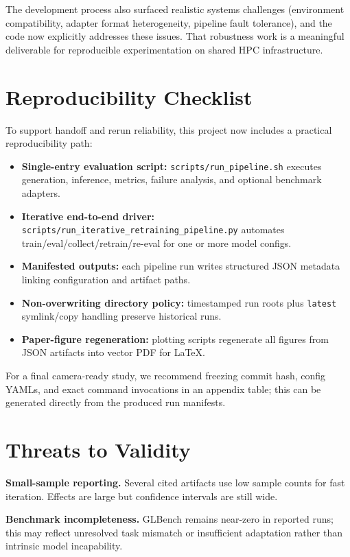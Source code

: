 \documentclass[sigplan,screen]{acmart}
\begin{document}
The development process also surfaced realistic systems challenges (environment compatibility, adapter format heterogeneity, pipeline fault tolerance), and the code now explicitly addresses these issues.
That robustness work is a meaningful deliverable for reproducible experimentation on shared HPC infrastructure.

\section{Reproducibility Checklist}
To support handoff and rerun reliability, this project now includes a practical reproducibility path:
\begin{itemize}
  \item \textbf{Single-entry evaluation script:} \texttt{scripts/run\_pipeline.sh} executes generation, inference, metrics, failure analysis, and optional benchmark adapters.
  \item \textbf{Iterative end-to-end driver:} \texttt{scripts/run\_iterative\_retraining\_pipeline.py} automates train/eval/collect/retrain/re-eval for one or more model configs.
  \item \textbf{Manifested outputs:} each pipeline run writes structured JSON metadata linking configuration and artifact paths.
  \item \textbf{Non-overwriting directory policy:} timestamped run roots plus \texttt{latest} symlink/copy handling preserve historical runs.
  \item \textbf{Paper-figure regeneration:} plotting scripts regenerate all figures from JSON artifacts into vector PDF for LaTeX.
\end{itemize}

For a final camera-ready study, we recommend freezing commit hash, config YAMLs, and exact command invocations in an appendix table; this can be generated directly from the produced run manifests.

\section{Threats to Validity}
\textbf{Small-sample reporting.}
Several cited artifacts use low sample counts for fast iteration.
Effects are large but confidence intervals are still wide.

\textbf{Benchmark incompleteness.}
GLBench remains near-zero in reported runs; this may reflect unresolved task mismatch or insufficient adaptation rather than intrinsic model incapability.
\end{document}
